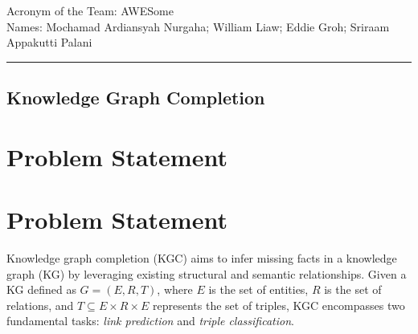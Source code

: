 \documentclass[12pt,a4paper]{article}
\begin{document}
\noindent Acronym of the Team: AWESome\\
Names: Mochamad Ardiansyah Nurgaha; William Liaw; Eddie Groh; Sriraam Appakutti Palani

    {\centering\rule{\linewidth}{.5pt}}

\begin{center}
    \section*{Knowledge Graph Completion}
\end{center}


%
%


\section{Problem Statement}\label{sec:problem_statement}


\section{Problem Statement}\label{sec:problem}

Knowledge graph completion (KGC) aims to infer missing facts in a knowledge graph (KG) by leveraging existing structural and semantic relationships. Given a KG defined as \( G = (E, R, T) \), where \( E \) is the set of entities, \( R \) is the set of relations, and \( T \subseteq E \times R \times E \) represents the set of triples, KGC encompasses two fundamental tasks: \emph{link prediction} and \emph{triple classification}.
\end{document}
